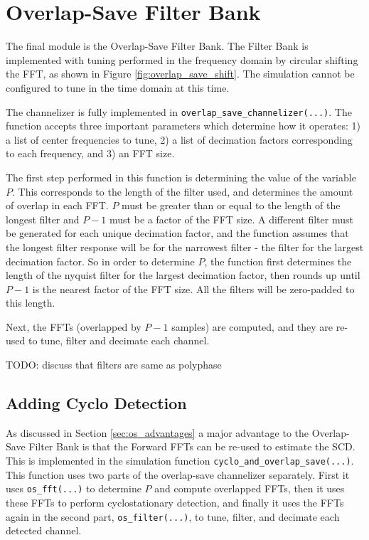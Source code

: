 \documentclass[12pt]{report}
\begin{document}
\section{Overlap-Save Filter Bank}
\label{sec:sim_os}
The final module is the Overlap-Save Filter Bank. The Filter Bank is
implemented with tuning performed in the frequency domain by circular shifting
the FFT, as shown in Figure \ref{fig:overlap_save_shift}. The
simulation cannot be configured to tune in the time domain at this time.

The channelizer is fully implemented in \texttt{overlap\_save\_channelizer(...)}.
The function accepts three important parameters which determine how it
operates: 1) a list of center frequencies to tune, 2) a list of decimation
factors corresponding to each frequency, and 3) an FFT size.

The first step performed in this function is determining the value of the
variable $P$. This corresponds to the length of the filter used, and determines
the amount of overlap in each FFT. $P$ must be greater than or equal to the
length of the longest filter and $P-1$ must be a factor of the FFT size.
A different filter must be generated for each unique decimation factor, and the
function assumes that the longest filter response will be for the narrowest
filter - the filter for the largest decimation factor. So in order to determine
$P$, the function first determines the length of the nyquist filter for the
largest decimation factor, then rounds up until $P-1$ is the nearest factor of
the FFT size. All the filters will be zero-padded to this length.

Next, the FFTs (overlapped by $P-1$ samples) are computed, and they are re-used
to tune, filter and decimate each channel.

TODO: discuss that filters are same as polyphase

\subsection{Adding Cyclo Detection}
\label{sec:sim_os_cyclo}
As discussed in Section \ref{sec:os_advantages} a major advantage to the
Overlap-Save Filter Bank is that the Forward FFTs can be re-used to estimate
the SCD. This is implemented in the simulation function
\texttt{cyclo\_and\_overlap\_save(...)}. This function uses two parts of the
overlap-save channelizer separately.  First it uses \texttt{os\_fft(...)} to
determine $P$ and compute overlapped FFTs, then it uses these FFTs to perform
cyclostationary detection, and finally it uses the FFTs again in the second part,
\texttt{os\_filter(...)}, to tune, filter, and decimate each detected channel.
\end{document}

